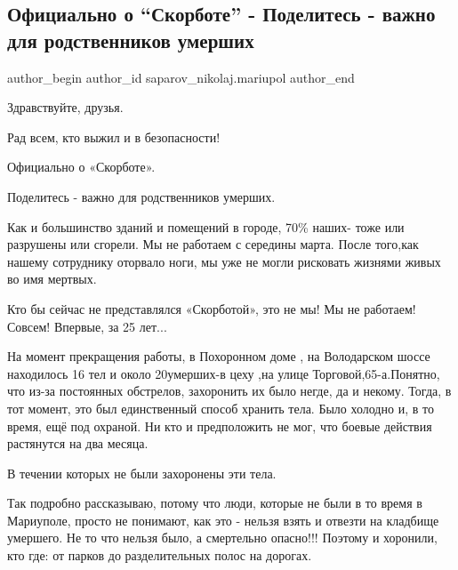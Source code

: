  
 
 
 
 

\subsection{Официально о \enquote{Скорботе} - Поделитесь - важно для родственников умерших}
\label{sec:01_06_2022.fb.saparov_nikolaj.mariupol.1.ofitsialno_o__skorbo}

\ifcmt
 author_begin
   author_id saparov_nikolaj.mariupol
 author_end
\fi

Здравствуйте, друзья. 

Рад всем, кто выжил и в безопасности!

Официально о «Скорботе».             

Поделитесь - важно для родственников умерших.

Как и большинство зданий и помещений в городе, 70\% наших- тоже или разрушены
или сгорели. Мы не работаем с середины марта. После того,как нашему
сотруднику оторвало ноги, мы уже не могли рисковать жизнями живых во имя
мертвых. 

Кто бы сейчас не представлялся «Скорботой»,  это не мы! Мы не работаем!
Совсем! Впервые, за 25 лет...

На момент прекращения работы, в Похоронном доме , на Володарском шоссе
находилось 16 тел и около 20умерших-в цеху ,на улице Торговой,65-а.Понятно, что
из-за постоянных обстрелов, захоронить их было негде, да и некому. Тогда, в тот
момент, это был единственный способ хранить тела. Было холодно и, в то
время, ещё под охраной. Ни кто и предположить не мог, что боевые действия
растянутся на два месяца.

В течении которых не были захоронены эти тела. 

Так подробно рассказываю, потому что люди, которые не были в то время в
Мариуполе, просто не понимают, как это - нельзя взять и отвезти на кладбище
умершего. Не то что нельзя было, а смертельно опасно!!! Поэтому и хоронили, кто
где: от парков до разделительных полос на дорогах.

